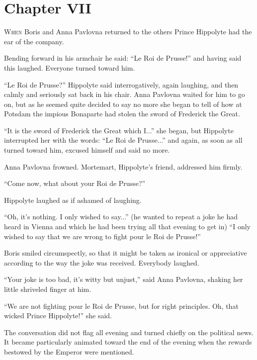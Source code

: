 \chapter*{Chapter VII}
\ifaudio     
{} 
\fi

\lettrine[lines=2, loversize=0.3, lraise=0]{\initfamily W}{hen}
Boris and Anna Pavlovna returned to the others Prince
Hippolyte had the ear of the company.

Bending forward in his armchair he said: ``Le Roi de Prusse!''
and having said this laughed. Everyone turned toward him.

``Le Roi de Prusse?'' Hippolyte said interrogatively, again
laughing, and then calmly and seriously sat back in his
chair. Anna Pavlovna waited for him to go on, but as he seemed
quite decided to say no more she began to tell of how at Potsdam
the impious Bonaparte had stolen the sword of Frederick the
Great.

``It is the sword of Frederick the Great which I...'' she began,
but Hippolyte interrupted her with the words: ``Le Roi de
Prusse...'' and again, as soon as all turned toward him, excused
himself and said no more.

Anna Pavlovna frowned. Mortemart, Hippolyte's friend, addressed
him firmly.

``Come now, what about your Roi de Prusse?''

Hippolyte laughed as if ashamed of laughing.

``Oh, it's nothing. I only wished to say...'' (he wanted to
repeat a joke he had heard in Vienna and which he had been trying
all that evening to get in) ``I only wished to say that we are
wrong to fight pour le Roi de Prusse!''

Boris smiled circumspectly, so that it might be taken as ironical
or appreciative according to the way the joke was
received. Everybody laughed.

``Your joke is too bad, it's witty but unjust,'' said Anna
Pavlovna, shaking her little shriveled finger at him.

``We are not fighting pour le Roi de Prusse, but for right
principles.  Oh, that wicked Prince Hippolyte!'' she said.

The conversation did not flag all evening and turned chiefly on
the political news. It became particularly animated toward the
end of the evening when the rewards bestowed by the Emperor were
mentioned.

